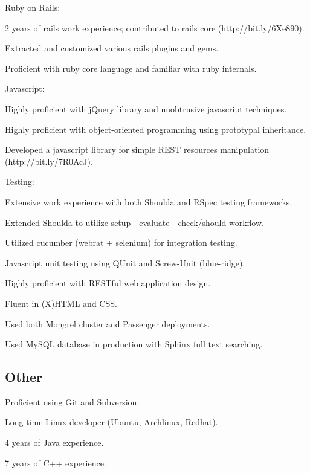 \documentclass{resume}
\begin{document}
\begin{compactitem}
  \item Ruby on Rails:
    \begin{compactitem}
      \item 2 years of rails work experience; contributed to rails core \mbox{(http://bit.ly/6Xe890)}.
      \item Extracted and customized various rails plugins and gems.
      \item Proficient with ruby core language and familiar with ruby internals.
    \end{compactitem}

  \item Javascript:
    \begin{compactitem}
      \item Highly proficient with jQuery library and unobtrusive javascript techniques.
      \item Highly proficient with object-oriented programming using prototypal inheritance.
      \item Developed a javascript library for simple REST resources manipulation \mbox{(\url{http://bit.ly/7R0AcJ})}.
    \end{compactitem}

  \item Testing:
    \begin{compactitem}
      \item Extensive work experience with both Shoulda and RSpec testing frameworks.
      \item Extended Shoulda to utilize setup - evaluate - check/should workflow.
      \item Utilized cucumber (webrat + selenium) for integration testing.
      \item Javascript unit testing using QUnit and Screw-Unit (blue-ridge).
    \end{compactitem}

  \item Highly proficient with RESTful web application design.
  \item Fluent in (X)HTML and CSS.
  \item Used both Mongrel cluster and Passenger deployments.
  \item Used MySQL database in production with Sphinx full text searching.
\end{compactitem}

\subsection{Other}
\begin{compactitem}
  \item Proficient using Git and Subversion.
  \item Long time Linux developer (Ubuntu, Archlinux, Redhat).
  \item 4 years of Java experience.
  \item 7 years of C++ experience.
\end{compactitem}
\end{document}
